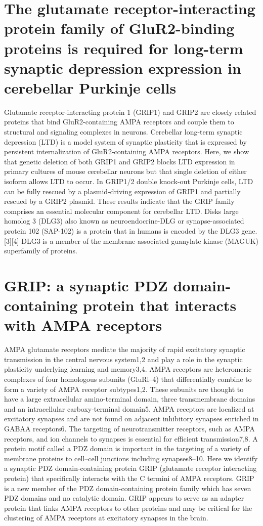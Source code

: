 \section{\cite{takamiya2008glutamate} The glutamate receptor-interacting protein family of GluR2-binding proteins is required for long-term synaptic depression expression in cerebellar Purkinje cells}
Glutamate receptor-interacting protein 1 (GRIP1) and GRIP2 are closely related proteins that bind GluR2-containing AMPA receptors and couple them to structural and signaling complexes in neurons. Cerebellar long-term synaptic depression (LTD) is a model system of synaptic plasticity that is expressed by persistent internalization of GluR2-containing AMPA receptors. Here, we show that genetic deletion of both GRIP1 and GRIP2 blocks LTD expression in primary cultures of mouse cerebellar neurons but that single deletion of either isoform allows LTD to occur. In GRIP1/2 double knock-out Purkinje cells, LTD can be fully rescued by a plasmid-driving expression of GRIP1 and partially rescued by a GRIP2 plasmid. These results indicate that the GRIP family comprises an essential molecular component for cerebellar LTD.
Disks large homolog 3 (DLG3) also known as neuroendocrine-DLG or synapse-associated protein 102 (SAP-102) is a protein that in humans is encoded by the DLG3 gene.[3][4] DLG3 is a member of the membrane-associated guanylate kinase (MAGUK) superfamily of proteins.
\section{\cite{dong1997grip} GRIP: a synaptic PDZ domain-containing protein that interacts with AMPA receptors}
AMPA glutamate receptors mediate the majority of rapid excitatory synaptic transmission in the central nervous system1,2 and play a role in the synaptic plasticity underlying learning and memory3,4. AMPA receptors are heteromeric complexes of four homologous subunits (GluRl–4) that differentially combine to form a variety of AMPA receptor subtypes1,2. These subunits are thought to have a large extracellular amino-terminal domain, three transmembrane domains and an intracellular carboxy-terminal domain5. AMPA receptors are localized at excitatory synapses and are not found on adjacent inhibitory synapses enriched in GABAA receptors6. The targeting of neurotransmitter receptors, such as AMPA receptors, and ion channels to synapses is essential for efficient transmission7,8. A protein motif called a PDZ domain is important in the targeting of a variety of membrane proteins to cell–cell junctions including synapses8–10. Here we identify a synaptic PDZ domain-containing protein GRIP (glutamate receptor interacting protein) that specifically interacts with the C termini of AMPA receptors. GRIP is a new member of the PDZ domain-containing protein family which has seven PDZ domains and no catalytic domain. GRIP appears to serve as an adapter protein that links AMPA receptors to other proteins and may be critical for the clustering of AMPA receptors at excitatory synapses in the brain.




